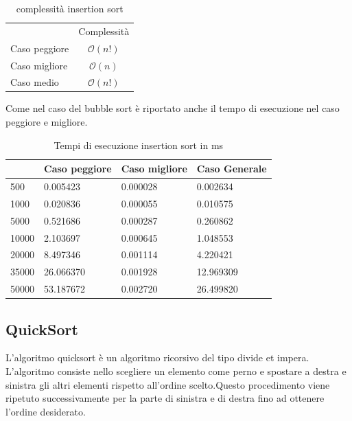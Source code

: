 \documentclass[12pt, a4paper]{report}
\begin{document}
\begin{table}[ht]
	\centering
	\begin{tabular}{lc}
 & Complessità \\
Caso peggiore & $ \mathcal{O}(n!)$ \\
Caso migliore & $ \mathcal{O}(n)$ \\
Caso medio & $ \mathcal{O}(n!)$\\
\end{tabular}
	\caption{complessità insertion sort}
	\label{Tab:CompInsertionSort}
\end{table}


	

Come nel caso del bubble sort è riportato anche il tempo di esecuzione nel caso peggiore e migliore.

\begin{table}[ht]
\centering
\begin{tabular}{| l | l | l | l |}
\hline
 & Caso peggiore & Caso migliore & Caso Generale \\ \hline
500 & 0.005423 & 0.000028 & 0.002634 \\ \hline
1000 & 0.020836	 & 0.000055 & 0.010575 \\ \hline
5000 & 0.521686 & 0.000287 & 0.260862 \\ \hline
10000 & 2.103697 & 0.000645 & 1.048553 \\ \hline
20000 & 8.497346 & 0.001114 & 4.220421 \\ \hline
35000 & 26.066370 & 0.001928 & 12.969309 \\ \hline
50000 & 53.187672 & 0.002720 & 26.499820 \\ \hline

\end{tabular}
\caption{Tempi di esecuzione insertion sort in ms}
\label{Tab:Tempi esecuzione InsertionSort}
\end{table}


\subsection{QuickSort}
L'algoritmo quicksort è un algoritmo ricorsivo del tipo divide et impera. L'algoritmo consiste nello scegliere un elemento come perno e spostare a destra e sinistra gli altri elementi rispetto all'ordine scelto.Questo procedimento viene ripetuto successivamente per la parte di sinistra e di destra fino ad ottenere l'ordine desiderato.
\end{document}
